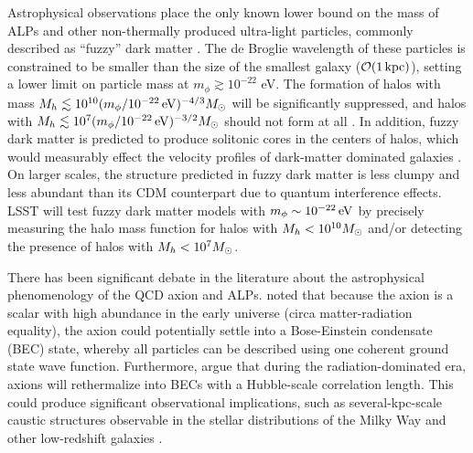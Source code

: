 Astrophysical observations place the only known lower bound on the mass of ALPs and other non-thermally produced ultra-light particles, commonly described as ``fuzzy'' dark matter \citep[\eg,][]{Hu:2000,Hui:2017}. 
The de Broglie wavelength of these particles is constrained to be smaller than the size of the smallest galaxy  ($\mathcal{O}(1\mathrm{\,kpc})$), setting a lower limit on particle mass at $m_\phi \gtrsim 10^{-22}$ eV. 
The formation of halos with mass $M_h \lesssim 10^{10} (m_\phi / 10^{-22} \mathrm{\,eV})^{-4/3} M_\odot$ will be significantly suppressed, and halos with $M_h \lesssim 10^7 (m_\phi / 10^{-22} \mathrm{\,eV})^{-3/2} M_\odot$ should not form at all \citep{Hui:2017}.
In addition, fuzzy dark matter is predicted to produce solitonic cores in the centers of halos, which would measurably effect the velocity profiles of dark-matter dominated galaxies \citep{Robles:2012uy,Robles:2018fur,Schive:2014hza,Du:2016aik}. 
On larger scales, the structure predicted in fuzzy dark matter is less clumpy and less abundant than its CDM counterpart due to quantum interference effects.
LSST will test fuzzy dark matter models with $m_\phi \sim 10^{-22} \mathrm{\,eV}$ by precisely measuring the halo mass function for halos with $M_h < 10^{10} M_\odot$ and/or detecting the presence of halos with $M_h < 10^{7} M_\odot$.


There has been significant debate in the literature about the astrophysical phenomenology of the QCD axion and ALPs.
\citet{Sikivie:2009} noted that because the axion is a scalar with high abundance in the early universe (circa matter-radiation equality), the axion could potentially settle into a Bose-Einstein condensate (BEC) state, whereby all particles can be described using one coherent ground state wave function. 
Furthermore, \citet{Sikivie:2009} argue that during the radiation-dominated era, axions will rethermalize into BECs with a Hubble-scale correlation length.
This could produce significant observational implications, such as several-kpc-scale caustic structures observable in the stellar distributions of the Milky Way and other low-redshift galaxies \citep[\eg,][]{Natarajan:2006,0805.4556,Rindler-Daller:2013zxa}.

